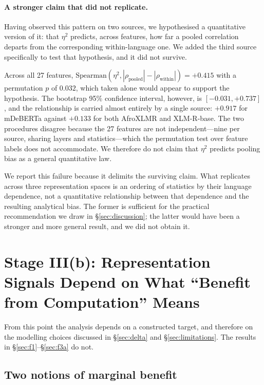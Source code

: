 \documentclass[11pt]{article}
\newcommand{\claim}[1]{#1}   %
\begin{document}
\paragraph{A stronger claim that did not replicate.} Having observed this
pattern on two sources, we hypothesised a quantitative version of it: that
$\eta^2$ predicts, across features, how far a pooled correlation departs from
the corresponding within-language one. We added the third source specifically to
test that hypothesis, and it did not survive.

Across all 27 features,
$\mathrm{Spearman}(\eta^2, |\rho_{\text{pooled}}|-|\rho_{\text{within}}|)=+0.415$
with a permutation $p$ of $0.032$, which taken alone would appear to support the
hypothesis. The bootstrap 95\% confidence interval, however, is
$[-0.031, +0.737]$, and the relationship is carried almost entirely by a single
source: $+0.917$ for mDeBERTa against $+0.133$ for both AfroXLMR and
XLM-R-base. The two procedures disagree because the 27 features are not
independent---nine per source, sharing layers and statistics---which the
permutation test over feature labels does not accommodate. \claim{We therefore
do not claim that $\eta^2$ predicts pooling bias as a general quantitative
law.}

We report this failure because it delimits the surviving claim. What replicates
across three representation spaces is an ordering of statistics by their
language dependence, not a quantitative relationship between that dependence and
the resulting analytical bias. The former is sufficient for the practical
recommendation we draw in \S\ref{sec:discussion}; the latter would have been a
stronger and more general result, and we did not obtain it.

\section{Stage III(b): Representation Signals Depend on What
``Benefit from Computation'' Means}
\label{sec:f3b}

From this point the analysis depends on a constructed target, and therefore on
the modelling choices discussed in \S\ref{sec:delta} and
\S\ref{sec:limitations}. The results in \S\ref{sec:f1}--\S\ref{sec:f3a} do not.

\subsection{Two notions of marginal benefit}
\label{sec:twotargets}
\end{document}
